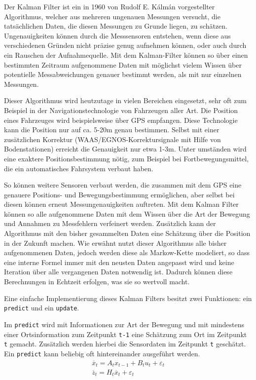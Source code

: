 \documentclass[12pt,a4paper,ngerman]{scrartcl}
\begin{document}
Der Kalman Filter ist ein in 1960 von Rudolf E. Kálmán vorgestellter Algorithmus, welcher aus mehreren ungenauen Messungen versucht, die tatsächlichen Daten, die diesen Messungen zu Grunde liegen, zu schätzen.\cite{kalman} Ungenauigkeiten können durch die Messsensoren entstehen, wenn diese aus verschiedenen Gründen nicht präzise genug aufnehmen können, oder auch durch ein Rauschen der Aufnahmequelle. Mit dem Kalman-Filter können so über einen bestimmten Zeitraum aufgenommene Daten mit möglichst vielem Wissen über potentielle Messabweichungen genauer bestimmt werden, als mit nur einzelnen Messungen.

Dieser Algorithmus wird heutzutage in vielen Bereichen eingesetzt, sehr oft zum Beispiel in der Navigationstechnologie von Fahrzeugen aller Art. Die Position eines Fahrzeuges wird beispielsweise über GPS empfangen. Diese Technologie kann die Position nur auf ca. 5-20m genau bestimmen. Selbst mit einer zusätzlichen Korrektur (WAAS/EGNOS-Korrektursignale mit Hilfe von Bodenstationen\cite{waas}\cite{egnos}) erreicht die Genauigkeit nur etwa 1-3m. Unter umständen wird eine exaktere Positionsbestimmung nötig, zum Beispiel bei Fortbewegungsmittel, die ein automatisches Fahrsystem verbaut haben.

So können weitere Sensoren verbaut werden, die zusammen mit dem GPS eine genauere Positions- und Bewegungsbestimmung ermöglichen, aber selbst bei diesen können erneut Messungenauigkeiten auftreten. Mit dem Kalman Filter können so alle aufgenommene Daten mit dem Wissen über die Art der Bewegung und Annahmen zu Messfehlern verfeinert werden. Zusätzlich kann der Algorithmus mit den bisher gesammelten Daten eine Schätzung über die Position in der Zukunft machen. Wie erwähnt nutzt dieser Algorithmus alle bisher aufgenommenen Daten, jedoch werden diese als Markow-Kette modeliert, so dass eine interne Formel immer mit den neusten Daten angepasst wird und keine Iteration über alle vergangenen Daten notwendig ist. Dadurch können diese Berechnungen in Echtzeit erfolgen, was sie so wertvoll macht.

Eine einfache Implementierung dieses Kalman Filters besitzt zwei Funktionen: ein {\tt predict} und ein {\tt update}.

Im {\tt predict} wird mit Informationen zur Art der Bewegung und mit mindestens einer Ortsinformation zum Zeitpunkt {\tt t-1} eine Schätzung zum Ort im Zeitpunkt {\tt t} gemacht. Zusätzlich werden hierbei die Sensordaten im Zeitpunkt {\tt t} geschätzt. Ein {\tt predict} kann beliebig oft hintereinander ausgeführt werden.
\begin{align}
\overline{x}_{t} = A_{t}x_{t-1} + B_{t}u_{t} + \varepsilon_{t} \label{eq:predict1}\\
\overline{z}_{t} = H_{t}\overline{x}_{t} + \varepsilon_{t} \label{eq:predict2}
\end{align}
\end{document}
